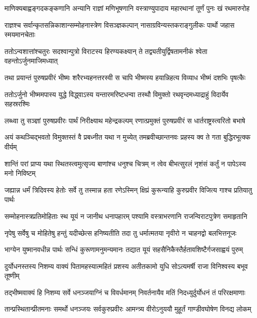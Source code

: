\twolineshloka
{माणिक्यबाह्वङ्गदकङ्कणानि अन्यानि राज्ञां मणिभूषणानि}
{वस्त्राण्युपादाय महारथानां तूर्णं पुनः खं रथमारुरोह}


\twolineshloka
{राज्ञश्च सर्वान्कृतसन्निकाशान्सम्मोहनास्त्रेण विसञ्ज्ञकल्पान्}
{नासाग्रविन्यस्तकराङ्गुलीकः पार्थो जहास स्मयमानचेताः}


\twolineshloka
{ततोऽन्वशात्तांश्चतुरः सदश्वान्पुत्रो विराटस्य हिरण्यकक्ष्यान्}
{ते तद्व्यतीयुर्द्विषतामनीकं श्वेता वहन्तोऽर्जुनमाजिमध्यात्}


\twolineshloka
{तथा प्रयान्तं पुरुषप्रवीरं भीष्मः शरैरभ्यहनत्तरस्वी}
{स चापि भीष्मस्य हयान्निहत्य विव्याध भीष्मं दशभिः पृषत्कैः}


\twolineshloka
{ततोऽर्जुनो भीष्ममपास्य युद्धे विद्ध्वाऽस्य यन्तारमरिष्टधन्वा}
{तस्थौ विमुक्तो रथवृन्दमध्याद्राहुं विदार्येव सहस्ररश्मिः}


\twolineshloka
{लब्ध्वा तु सञ्ज्ञां पुरुषप्रवीरः पार्थं निरीक्ष्याथ महेन्द्रकल्पम्}
{रणात्प्रमुक्तं पुरुषप्रवीरं स धार्तराष्ट्रस्त्वरितो बभाषे}


\twolineshloka
{अयं कथञ्चिद्भवतो विमुक्तस्तं वै प्रबध्नीत यथा न मुच्येत्}
{तमब्रवीच्छान्तनवः प्रहस्य क्व ते गता बुद्धिरभूत्क्क वीर्यम्}


\twolineshloka
{शान्तिं परां प्राप्य यथा स्थितस्त्वमुत्सृज्य बाणांश्च धनुश्च चित्रम्}
{न त्वेव बीभत्सुरलं नृशंसं कर्तुं न पापेऽस्य मनो निविष्टम्}


\twolineshloka
{जह्यान्न धर्मं त्रिदिवस्य हेतोः सर्वे तु तस्मान्न हता रणेऽस्मिन्}
{क्षिप्रं कुरून्याहि कुरुप्रवीर विजित्य गाश्च प्रतियातु पार्थः}


\twolineshloka
{सम्मोहनास्त्रप्रतिमोहिताः स्थ यूयं न जानीथ धनापहारम्}
{पश्यामि वस्त्राभरणानि राजन्विराटपुत्रेण समाहृतानि}


\twolineshloka
{नृपेषु सर्वेषु च मोहितेषु हन्तुं यदीच्छेत्स हनिष्यतीति}
{तदा तु धर्मात्मतया नृवीरो न चाहनद्वो बलभित्तनूजः}


\twolineshloka
{भाग्येन युष्मानवधीन्न पार्थः सन्धिं कुरूणामनुमन्यमानः}
{तद्यात यूयं सहसैनिकैस्तैर्हतावशिष्टैर्गजसाह्वयं पुरुम्}



\twolineshloka
{दुर्योधनस्तस्य निशम्य वाक्यं पितामहस्यात्महितं प्रशस्य}
{अतीतकामो युधि सोऽत्यमर्षी राजा विनिश्वस्य बभूव तूष्णीम्}


\twolineshloka
{तद्भीष्मवाक्यं हि निशम्य सर्वे धनञ्जयाग्निं च विवर्धमानम्}
{निवर्तनायैव मतिं निदध्युर्दुर्योधनं तं परिरक्षमाणाः}


\twolineshloka
{तान्प्रस्थितान्प्रीतमनाः समर्थो धनञ्जयः सर्वकुरुप्रवीरः}
{आमन्त्र्य वीरोऽनुययौ मुहूर्तं गाण्डीवघोषेण विनद्य लोकम्}


